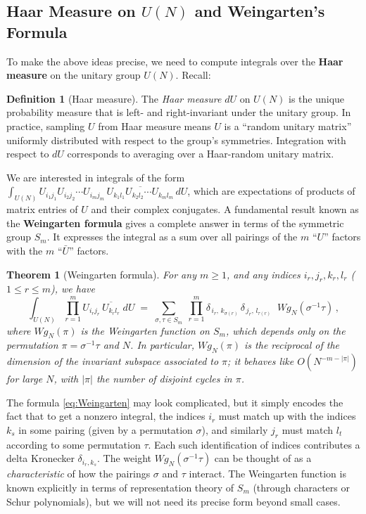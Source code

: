 \documentclass[letterpaper,11pt,oneside,reqno]{article}
\numberwithin{equation}{section}
\newtheorem{theorem}[proposition]{Theorem}
\theoremstyle{definition}
\newtheorem{definition}[proposition]{Definition}
\begin{document}
\subsection*{Haar Measure on $U(N)$ and Weingarten's Formula}

To make the above ideas precise, we need to compute integrals over the \textbf{Haar measure} on the unitary group $U(N)$. Recall:

\begin{definition}[Haar measure]
The \emph{Haar measure} $dU$ on $U(N)$ is the unique probability measure that is left- and right-invariant under the unitary group. In practice, sampling $U$ from Haar measure means $U$ is a ``random unitary matrix'' uniformly distributed with respect to the group's symmetries. Integration with respect to $dU$ corresponds to averaging over a Haar-random unitary matrix.
\end{definition}

We are interested in integrals of the form $\int_{U(N)} U_{i_1 j_1}U_{i_2 j_2}\cdots U_{i_m j_m} \,\overline{U_{k_1 l_1}U_{k_2 l_2}\cdots U_{k_m l_m}}\,dU$, which are expectations of products of matrix entries of $U$ and their complex conjugates. A fundamental result known as the \textbf{Weingarten formula} gives a complete answer in terms of the symmetric group $S_m$. It expresses the integral as a sum over all pairings of the $m$ ``$U$'' factors with the $m$ ``$\bar U$'' factors.

\begin{theorem}[Weingarten formula]
For any $m\ge 1$, and any indices $i_r,j_r,k_r,l_r$ ($1\le r \le m$), we have
\begin{equation}\label{eq:Weingarten}
\int_{U(N)} \prod_{r=1}^m U_{i_r j_r}\,\overline{U_{k_r l_r}}\;dU \;=\; \sum_{\sigma,\tau \in S_m} \;\prod_{r=1}^m \delta_{\,i_r,\,k_{\sigma(r)}}\,\delta_{\,j_r,\,l_{\tau(r)}}\;\;Wg_N(\sigma^{-1}\tau)\,,
\end{equation}
where $Wg_N(\pi)$ is the \emph{Weingarten function} on $S_m$, which depends only on the permutation $\pi=\sigma^{-1}\tau$ and $N$. In particular, $Wg_N(\pi)$ is the reciprocal of the dimension of the invariant subspace associated to $\pi$; it behaves like $O(N^{-m-|\pi|})$ for large $N$, with $|\pi|$ the number of disjoint cycles in $\pi$.
\end{theorem}

The formula \eqref{eq:Weingarten} may look complicated, but it simply encodes the fact that to get a nonzero integral, the indices $i_r$ must match up with the indices $k_s$ in some pairing (given by a permutation $\sigma$), and similarly $j_r$ must match $l_t$ according to some permutation $\tau$. Each such identification of indices contributes a delta Kronecker $\delta_{i_r,k_{s}}$. The weight $Wg_N(\sigma^{-1}\tau)$ can be thought of as a \emph{characteristic} of how the pairings $\sigma$ and $\tau$ interact. The Weingarten function is known explicitly in terms of representation theory of $S_m$ (through characters or Schur polynomials), but we will not need its precise form beyond small cases.
\end{document}
